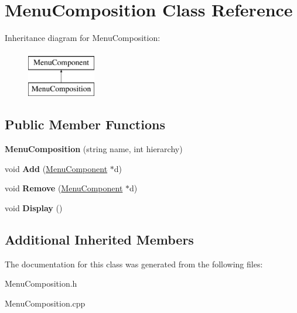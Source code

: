 \hypertarget{classMenuComposition}{\section{Menu\-Composition Class Reference}
\label{classMenuComposition}
}
Inheritance diagram for Menu\-Composition\-:\begin{figure}[H]
\begin{center}
\leavevmode
\includegraphics[height=2.000000cm]{d3/d20/classMenuComposition}
\end{center}
\end{figure}
\subsection*{Public Member Functions}
\begin{DoxyCompactItemize}
\item 
\hypertarget{classMenuComposition_aa8b77abb0d25ed9827bccca6e10bc396}{{\bfseries Menu\-Composition} (string name, int hierarchy)}\label{classMenuComposition_aa8b77abb0d25ed9827bccca6e10bc396}

\item 
\hypertarget{classMenuComposition_adc8165554a65bac3e2386895c5a6dfac}{void {\bfseries Add} (\hyperlink{classMenuComponent}{Menu\-Component} $\ast$d)}\label{classMenuComposition_adc8165554a65bac3e2386895c5a6dfac}

\item 
\hypertarget{classMenuComposition_a83f4e293743f306e960c3c1cf0b920ce}{void {\bfseries Remove} (\hyperlink{classMenuComponent}{Menu\-Component} $\ast$d)}\label{classMenuComposition_a83f4e293743f306e960c3c1cf0b920ce}

\item 
\hypertarget{classMenuComposition_a5f94b452c1a15c43e744ad72e1fb3895}{void {\bfseries Display} ()}\label{classMenuComposition_a5f94b452c1a15c43e744ad72e1fb3895}

\end{DoxyCompactItemize}
\subsection*{Additional Inherited Members}


The documentation for this class was generated from the following files\-:\begin{DoxyCompactItemize}
\item 
Menu\-Composition.\-h\item 
Menu\-Composition.\-cpp\end{DoxyCompactItemize}
